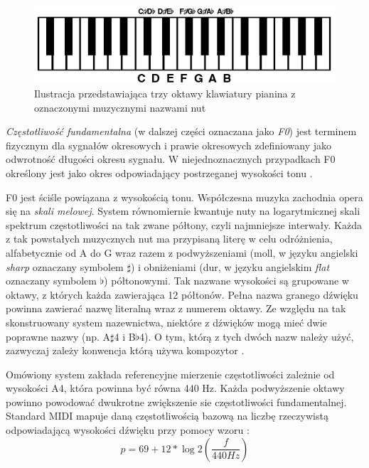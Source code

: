 \documentclass[12pt,a4paper,twoside]{mwart}
\begin{document}
\begin{figure}[H]
  \begin{center}
    \includegraphics[scale=0.5]{images/PianoRoll.png}
    \caption{Ilustracja przedstawiająca trzy oktawy klawiatury pianina z oznaczonymi muzycznymi nazwami nut}
    \label{fig:pianoRoll}
  \end{center}
\end{figure}

\textit{Częstotliwość fundamentalna} (w dalszej części oznaczana jako \textit{F0}) jest terminem fizycznym dla sygnałów okresowych i prawie okresowych zdefiniowany jako odwrotność długości okresu sygnału. W niejednoznacznych przypadkach F0 określony jest jako okres odpowiadający postrzeganej wysokości tonu \cite[8]{Transcription:Anssi:SignalProcessingMethods}.

F0 jest ściśle powiązana z wysokością tonu. Współczesna muzyka zachodnia opera się na \textit{skali melowej}. System równomiernie kwantuje nuty na logarytmicznej skali spektrum częstotliwości na tak zwane półtony, czyli najmniejsze interwały. Każda z tak powstałych muzycznych nut ma przypisaną literę w celu odróżnienia, alfabetycznie od A do G wraz razem z podwyższeniami (moll, w języku angielski \textit{sharp} oznaczany symbolem $\sharp$) i obniżeniami (dur, w języku angielskim \textit{flat} oznaczany symbolem $\flat$) półtonowymi. Tak nazwane wysokości są grupowane w oktawy, z których każda zawierająca 12 półtonów. Pełna nazwa granego dźwięku powinna zawierać nazwę literalną wraz z numerem oktawy. Ze względu na tak skonstruowany system nazewnictwa, niektóre z dźwięków mogą mieć dwie poprawne nazwy (np. A$\sharp$4 i B$\flat$4). O tym, którą z tych dwóch nazw należy użyć, zazwyczaj zależy konwencja którą używa kompozytor \cite[215-220]{Transcription:Burns:InversalScalesTuning}.

Omówiony system zakłada referencyjne mierzenie częstotliwości zależnie od wysokości A4, która powinna być równa 440 Hz. Każda podwyższenie oktawy powinno powodować dwukrotne zwiększenie sie częstotliwości fundamentalnej. Standard MIDI mapuje daną częstotliwością bazową na liczbę rzeczywistą odpowiadającą wysokości dźwięku przy pomocy wzoru \cite[67-71]{Homerecording:LevelUp}:
\begin{equation} \label{eq:midi_freq}
p = 69 + 12 * \log{2}(\frac{f}{440 Hz})
\end{equation}
\end{document}
